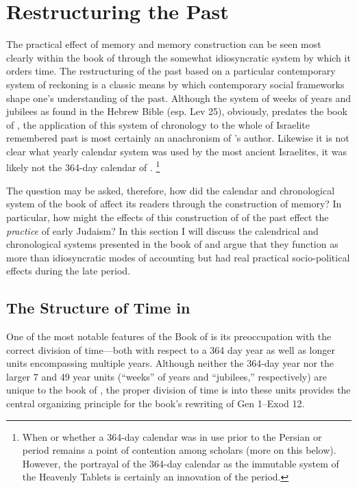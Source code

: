 
\section{Restructuring the Past}
The practical effect of memory and memory construction can be seen most clearly within the book of \jub through the somewhat idiosyncratic system by which it orders time. The restructuring of the past based on a particular contemporary system of reckoning is a classic means by which contemporary social frameworks shape one's understanding of the past. Although the system of weeks of years and jubilees as found in the Hebrew Bible (esp. Lev 25), obviously, predates the book of \jub, the application of this system of chronology to the whole of Israelite remembered past is most certainly an anachronism of \jub's author. Likewise it is not clear what yearly calendar system was used by the most ancient Israelites, it was likely not the 364-day calendar of \jub.%
    \footnote{When or whether a 364-day calendar was in use prior to the Persian or \secondtemple period remains a point of contention among scholars (more on this below). However, the portrayal of the 364-day calendar as the immutable system of the Heavenly Tablets is certainly an innovation of the \secondtemple period.}

The question may be asked, therefore, how did the calendar and chronological system of the book of \jub affect its readers through the construction of memory? In particular, how might the effects of this construction of of the past effect the \emph{practice} of early Judaism? In this section I will discuss the calendrical and chronological systems presented in the book of \jub and argue that they function as more than idiosyncratic modes of accounting but had real practical socio-political effects during the late \secondtemple period.

\subsection{The Structure of Time in \jub}
One of the most notable features of the Book of \jub is its preoccupation with the correct division of time---both with respect to a 364 day year as well as longer units encompassing multiple years. Although neither the 364-day year nor the larger 7 and 49 year units (``weeks'' of years and ``jubilees,'' respectively) are unique to the book of \jub, the proper division of time is into these units provides the central organizing principle for the book's rewriting of Gen 1--Exod 12.

